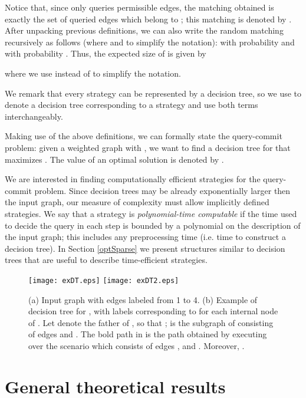 \documentclass[12pt]{article}
\begin{document}
	Notice that, since  only queries permissible edges, the matching obtained is exactly the set of queried edges which belong to ; this matching is denoted by . After unpacking previous definitions, we can also write the random matching  recursively as follows (where  and  to simplify the notation):  with probability  and  with probability . Thus, the expected size of  is given by

	where we use  instead of  to simplify the notation. 
			
	We remark that every strategy can be represented by a decision tree, so we use  to denote a decision tree corresponding to a strategy  and use both terms interchangeably.
	
	Making use of the above definitions, we can formally state the query-commit problem: given a weighted graph  with , we want to find a decision tree  for  that maximizes . The value of an optimal solution is denoted by .
		
	We are interested in finding computationally efficient strategies for the query-commit problem. Since decision trees may be already exponentially larger then the input graph, our measure of complexity must allow implicitly defined strategies. We say that a strategy is \emph{polynomial-time computable} if the time used to decide the query in each step is bounded by a polynomial on the description of the input graph; this includes any preprocessing time (i.e. time to construct a decision tree). In Section \ref{optSparse} we present structures similar to decision trees that are useful to describe time-efficient strategies.
		
\begin{figure}
	\centering
		\texttt{[image: exDT.eps]} \hspace{90pt}
		\texttt{[image: exDT2.eps]}
	\caption{(a) Input graph  with edges labeled from 1 to 4. (b) Example of decision tree  for , with labels corresponding to  for each internal node  of . Let  denote the father of , so that ;  is the subgraph of  consisting of edges  and . The bold path in  is the path obtained by executing  over the scenario  which consists of edges ,  and . Moreover, .}
	\label{fig:exDT}
\end{figure}



	\section{General theoretical results} \label{theoretical}
	
\end{document}
